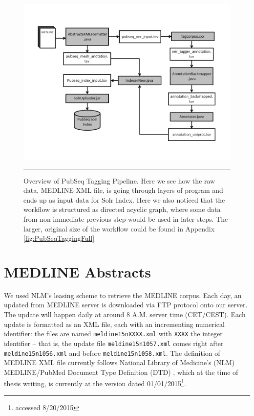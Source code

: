 \begin{figure}[htbp]
    \includegraphics[width=6in]{Figures/tagging_pipeline_complete.png}
    \rule{35em}{0.5pt}
  \caption[(Resized) Overview of PubSeq Tagging Pipeline with all essential programs showed as nodes and important input/output files shown]{Overview of PubSeq Tagging Pipeline. Here we see how the raw data, MEDLINE XML file, is going through layers of program and ends up as input data for Solr Index. Here we also noticed that the workflow is structured as directed acyclic graph, where some data from non-immediate previous step would be used in later steps. The larger, original size of the workflow could be found in Appendix \ref{fig:PubSeqTaggingFull}}
  \label{fig:PubSeqTaggingComplete}
\end{figure}


\section{MEDLINE Abstracts}

\label{sec:MEDLINEAbstracts}

We used NLM's leasing scheme \citep{MEDLINE} to retrieve the MEDLINE corpus. Each day, an updated from MEDLINE server is downloaded via FTP protocol onto our server. The update will happen daily at around 8 A.M. server time (CET/CEST). Each update is formatted as an XML file, each with an incrementing numerical identifier: the files are named \texttt{meldine15nXXXX.xml} with \texttt{XXXX} the integer identifier -- that is, the update file \texttt{meldine15n1057.xml} comes right after \texttt{meldine15n1056.xml} and before \texttt{meldine15n1058.xml}. The definition of MEDLINE XML file currently follows National Library of Medicine's (NLM) MEDLINE/PubMed Document Type Definition (DTD) \citep{MEDLINEDTD}, which at the time of thesis writing, is currently at the version dated 01/01/2015\footnote{accessed 8/20/2015}.


